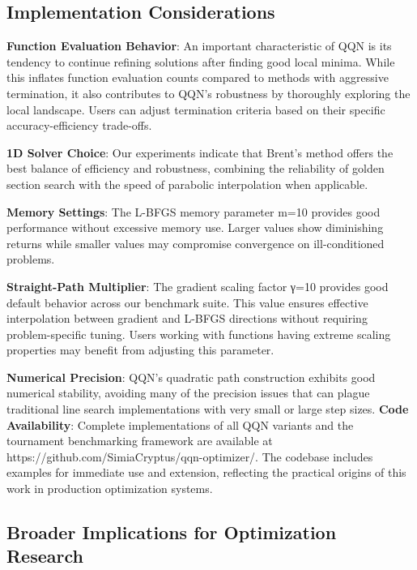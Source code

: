 \hypertarget{implementation-considerations}{%
\subsection{Implementation Considerations}\label{implementation-considerations}}

\textbf{Function Evaluation Behavior}: An important characteristic of QQN is its tendency to continue refining solutions after finding good local minima. While this inflates function evaluation counts compared to methods with aggressive termination, it also contributes to QQN's robustness by thoroughly exploring the local landscape. Users can adjust termination criteria based on their specific accuracy-efficiency trade-offs.

\textbf{1D Solver Choice}: Our experiments indicate that Brent's method offers the best balance of efficiency and robustness, combining the reliability of golden section search with the speed of parabolic interpolation when applicable.

\textbf{Memory Settings}: The L-BFGS memory parameter m=10 provides good performance without excessive memory use. Larger values show diminishing returns while smaller values may compromise convergence on ill-conditioned problems.

\textbf{Straight-Path Multiplier}: The gradient scaling factor γ=10 provides good default behavior across our benchmark suite. This value ensures effective interpolation between gradient and L-BFGS directions without requiring problem-specific tuning. Users working with functions having extreme scaling properties may benefit from adjusting this parameter.

\textbf{Numerical Precision}: QQN's quadratic path construction exhibits good numerical stability, avoiding many of the precision issues that can plague traditional line search implementations with very small or large step sizes.
\textbf{Code Availability}: Complete implementations of all QQN variants and the tournament benchmarking framework are available at https://github.com/SimiaCryptus/qqn-optimizer/. The codebase includes examples for immediate use and extension, reflecting the practical origins of this work in production optimization systems.

\hypertarget{broader-implications-for-optimization-research}{%
\subsection{Broader Implications for Optimization Research}\label{broader-implications-for-optimization-research}}

